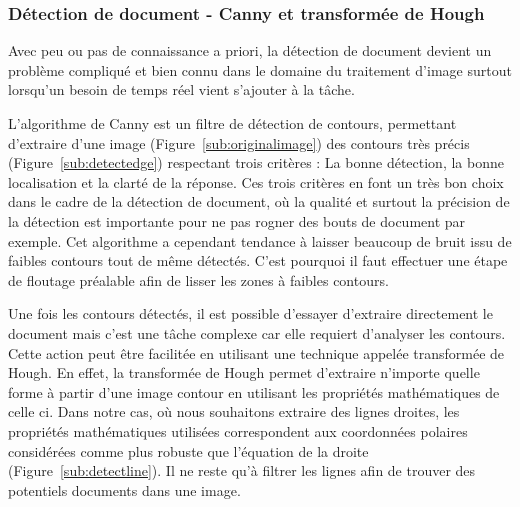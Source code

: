 \subsubsection{Détection de document - Canny et transformée de Hough}
\label{subsubsec:cannyhough} 
Avec peu ou pas de connaissance a priori, la détection de document devient un problème compliqué et bien connu dans le domaine du traitement d'image surtout lorsqu'un besoin de temps réel vient s'ajouter à la tâche.

L'algorithme de Canny\cite{Canny86acomputational} est un filtre de détection de contours, permettant d'extraire d'une image (Figure~\ref{sub:originalimage}) des contours très précis (Figure~\ref{sub:detectedge}) respectant trois critères : La bonne détection, la bonne localisation et la clarté de la réponse. Ces trois critères en font un très bon choix dans le cadre de la détection de document, où la qualité et surtout la précision de la détection est importante pour ne pas rogner des bouts de document par exemple. Cet algorithme a cependant tendance à laisser beaucoup de bruit issu de faibles contours tout de même détectés. C'est pourquoi il faut effectuer une étape de floutage préalable afin de lisser les zones à faibles contours.

Une fois les contours détectés, il est possible d'essayer d'extraire directement le document mais c'est une tâche complexe car elle requiert d'analyser les contours. Cette action peut être facilitée en utilisant une technique appelée transformée de Hough\cite{hough}. En effet, la transformée de Hough permet d'extraire n'importe quelle forme à partir d'une image contour en utilisant les propriétés mathématiques de celle ci. Dans notre cas, où nous souhaitons extraire des lignes droites, les propriétés mathématiques utilisées correspondent aux coordonnées polaires considérées comme plus robuste que l’équation de la droite (Figure~\ref{sub:detectline}). Il ne reste qu'à filtrer les lignes afin de trouver des potentiels documents dans une image.

